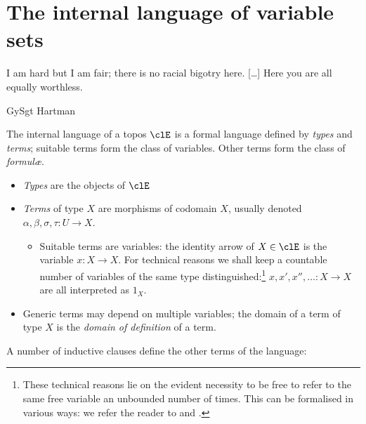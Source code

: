 \documentclass{amsart}
\begin{document}
\section{The internal language of variable sets}
\epigraph{I am hard but I am fair; there is no racial bigotry here. [\dots\unkern] Here you are all equally worthless.}{GySgt Hartman}
The internal language of a topos $\clE$ is a formal language defined by \emph{types} and \emph{terms}; suitable terms form the class of variables. Other terms form the class of \emph{formul\ae}.
\begin{itemize}
  \item \emph{Types} are the objects of $\clE$
  \item \emph{Terms} of type $X$ are morphisms of codomain $X$, usually denoted $\alpha,\beta,\sigma,\tau : U \to X$.
        \begin{itemize}
          \item Suitable terms are variables: the identity arrow of $X\in\clE$ is the variable  $x : X \to X$. For technical reasons we shall keep a countable number of variables of the same type distinguished:\footnote{These technical reasons lie on the evident necessity to be free to refer to the same free variable an unbounded number of times. This can be formalised in various ways: we refer the reader to \cite[]{lambekscott} and \cite[]{johnstopos}.} $x,x',x'',\dots : X \to X$ are all interpreted as $1_X$.
        \end{itemize}
  \item Generic terms may depend on multiple variables; the domain of a term of type $X$ is the \emph{domain of definition} of a term.
\end{itemize}
A number of inductive clauses define the other terms of the language:
\end{document}
